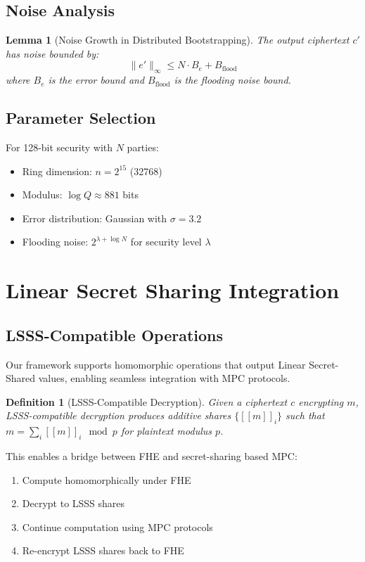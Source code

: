 \documentclass[11pt,a4paper]{article}
\newtheorem{lemma}[theorem]{Lemma}
\newtheorem{definition}[theorem]{Definition}
\begin{document}
\subsection{Noise Analysis}

\begin{lemma}[Noise Growth in Distributed Bootstrapping]
The output ciphertext $c'$ has noise bounded by:
\begin{equation}
\|e'\|_\infty \leq N \cdot B_e + B_{\text{flood}}
\end{equation}
where $B_e$ is the error bound and $B_{\text{flood}}$ is the flooding noise bound.
\end{lemma}

\subsection{Parameter Selection}

For 128-bit security with $N$ parties:
\begin{itemize}
    \item Ring dimension: $n = 2^{15}$ (32768)
    \item Modulus: $\log Q \approx 881$ bits
    \item Error distribution: Gaussian with $\sigma = 3.2$
    \item Flooding noise: $2^{\lambda + \log N}$ for security level $\lambda$
\end{itemize}

\section{Linear Secret Sharing Integration}

\subsection{LSSS-Compatible Operations}

Our framework supports homomorphic operations that output Linear Secret-Shared values, enabling seamless integration with MPC protocols.

\begin{definition}[LSSS-Compatible Decryption]
Given a ciphertext $c$ encrypting $m$, LSSS-compatible decryption produces additive shares $\{[\![m]\!]_i\}$ such that $m = \sum_i [\![m]\!]_i \mod p$ for plaintext modulus $p$.
\end{definition}

This enables a bridge between FHE and secret-sharing based MPC:
\begin{enumerate}
    \item Compute homomorphically under FHE
    \item Decrypt to LSSS shares
    \item Continue computation using MPC protocols
    \item Re-encrypt LSSS shares back to FHE
\end{enumerate}
\end{document}
